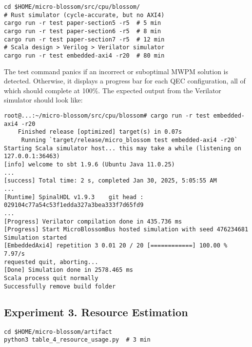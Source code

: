
\begin{verbatim}
cd $HOME/micro-blossom/src/cpu/blossom/
# Rust simulator (cycle-accurate, but no AXI4)
cargo run -r test paper-section5 -r5  # 5 min
cargo run -r test paper-section6 -r5  # 8 min
cargo run -r test paper-section7 -r5  # 12 min
# Scala design > Verilog > Verilator simulator
cargo run -r test embedded-axi4 -r20  # 80 min
\end{verbatim}


The test command panics if an incorrect or suboptimal MWPM solution is detected.
Otherwise, it displays a progress bar for each QEC configuration, all of which should complete at 100\%.
The expected output from the Verilator simulator should look like:

\begin{verbatim}
root@...:~/micro-blossom/src/cpu/blossom# cargo run -r test embedded-axi4 -r20
    Finished release [optimized] target(s) in 0.07s
     Running `target/release/micro_blossom test embedded-axi4 -r20`
Starting Scala simulator host... this may take a while (listening on 127.0.0.1:36463)
[info] welcome to sbt 1.9.6 (Ubuntu Java 11.0.25)                                                                          ...
[success] Total time: 2 s, completed Jan 30, 2025, 5:05:55 AM
...
[Runtime] SpinalHDL v1.9.3    git head : 029104c77a54c53f1edda327a3bea333f7d65fd9
...
[Progress] Verilator compilation done in 435.736 ms
[Progress] Start MicroBlossomBus hosted simulation with seed 476234681
Simulation started
[EmbeddedAxi4] repetition 3 0.01 20 / 20 [============] 100.00 % 7.97/s 
requested quit, aborting...
[Done] Simulation done in 2578.465 ms
Scala process quit normally
Successfully remove build folder
\end{verbatim}

\subsection{Experiment 3. Resource Estimation}\label{ssec:ae-exp3}


\begin{verbatim}
cd $HOME/micro-blossom/artifact
python3 table_4_resource_usage.py  # 3 min
\end{verbatim}

